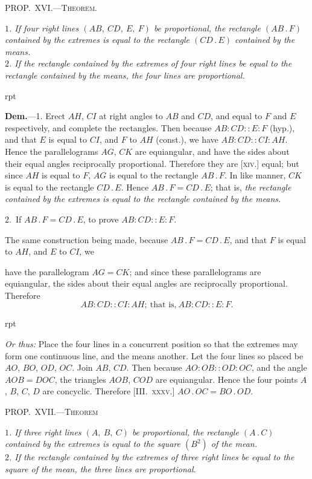 \documentclass[oneside]{book}
\newcounter{wrapwidth}
\newcommand\mypropl[2]{
\bigskip\Needspace*{4\baselineskip}\begin{center}\textsc{#1}\end{center}
\hspace{\parindent}\emph{#2}\par\medskip
}
\newcommand\imgflow[3]{
\setcounter{wrapwidth}{#1}

\begin{wrapfigure}[#2]{r}{\value{wrapwidth}pt}
\begin{center}
\vspace{-0.3in}

\end{center}
\end{wrapfigure}
}
\begin{document}
\mypropl{PROP\@.~XVI\@.---Theorem.}{$1$. If four right lines $(AB,\ CD,\ E,\ F)$ be proportional,
the rectangle $(AB\,.\,F)$ contained by the extremes is equal
to the rectangle $(CD\,.\,E)$ contained by the means.\\
\indent $2$. If the rectangle contained by the extremes of four
right lines be equal to the rectangle contained by the
means, the four lines are proportional.}


\imgflow{175}{9}{f187}

\textbf{Dem.}---1. Erect $AH$, $CI$ at right angles to $AB$ and
$CD$, and equal to $F$
and $E$ respectively,
and complete the rectangles.
Then because
$AB : CD :: E : F$
(hyp.), and that $E$ is
equal to $CI$, and $F$ to
$AH$ (const.), we have
$AB : CD:: CI : AH$.
Hence the parallelograms $AG$, $CK$ are equiangular, and
have the sides about their equal angles reciprocally
proportional. Therefore they are [\textsc{xiv.}] equal; but
since $AH$ is equal to $F$, $AG$ is equal to the rectangle
$AB\,.\,F$. In like manner, $CK$ is equal to the rectangle
$CD\,.\,E$. Hence $AB\,.\,F = CD\,.\,E$; that is, \emph{the rectangle
contained by the extremes is equal to the rectangle contained
by the means.}

2.~If $AB\,.\,F = CD\,.\,E$, to prove $AB :CD :: E : F$.

The same construction being made, because $AB\,.\,F
= CD\,.\,E$, and that $F$ is equal to $AH$, and $E$ to $CI$, we

have the parallelogram $AG = CK$; and since these parallelograms
are equiangular, the sides about their equal
angles are reciprocally proportional. Therefore
\[
AB : CD :: CI : AH;\ \text{that is,}\ AB : CD :: E : F.
\]


\imgflow{100}{7}{f188}

\begin{footnotesize}
\emph{Or thus:} Place the four lines in a concurrent
position so that the extremes may
form one continuous line, and the means
another. Let the four lines so placed be
$AO$, $BO$, $OD$, $OC$. Join $AB$, $CD$. Then
because $AO : OB :: OD : OC$, and the
angle $AOB = DOC$, the triangles $AOB$,
$COD$ are equiangular. Hence the four
points $A$, $B$, $C$, $D$ are concyclic. Therefore
[III\@.~\textsc{xxxv.}] $AO\,.\,OC = BO\,.\,OD$.
\par\end{footnotesize}

\mypropl{PROP\@.~XVII\@.---Theorem}{$1$. 
If three right lines $(A,\ B,\ C)$ be proportional, the
rectangle $(A\,.\,C)$ contained by the extremes is equal to the
square $(B^{2})$ of the mean.\\
\indent $2$. If the rectangle contained by the extremes of three
right lines be equal to the square of the mean, the three
lines are proportional.}
\end{document}
